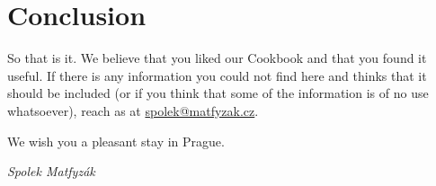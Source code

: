 \section{Conclusion}
So that is it. We believe that you liked our Cookbook and that you found it
useful. If there is any information you could not find here and thinks that it
should be included (or if you think that some of the information is of no use
whatsoever), reach as at \url{spolek@matfyzak.cz}.

\medskip

We wish you a pleasant stay in Prague.

\hskip 8cm \it Spolek Matfyzák